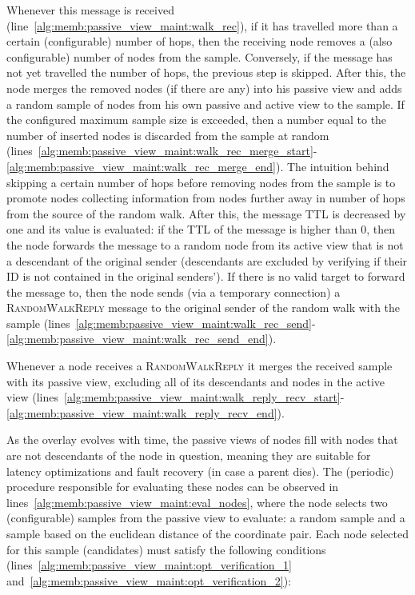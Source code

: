 

Whenever this message is received (line~\ref{alg:memb:passive_view_maint:walk_rec}), if it has travelled more than a certain (configurable) number of hops, then the receiving node removes a (also configurable) number of nodes from the sample. Conversely, if the message has not yet travelled the number of hops, the previous step is skipped. After this, the node merges the removed nodes (if there are any) into his passive view and adds a random sample of nodes from his own passive and active view to the sample. If the configured maximum sample size is exceeded, then a number equal to the number of inserted nodes is discarded from the sample at random (lines~\ref{alg:memb:passive_view_maint:walk_rec_merge_start}-\ref{alg:memb:passive_view_maint:walk_rec_merge_end}). The intuition behind skipping a certain number of hops before removing nodes from the sample is to promote nodes collecting information from nodes further away in number of hops from the source of the random walk. After this, the message TTL is decreased by one and its value is evaluated: if the TTL of the message is higher than 0, then the node forwards the message to a random node from its active view that is not a descendant of the original sender (descendants are excluded by verifying if their ID is not contained in the original senders'). If there is no valid target to forward the message to, then the node sends (via a temporary connection) a \textsc{RandomWalkReply} message to the original sender of the random walk with the sample (lines~\ref{alg:memb:passive_view_maint:walk_rec_send}-\ref{alg:memb:passive_view_maint:walk_rec_send_end}). 

Whenever a node receives a \textsc{RandomWalkReply} it merges the received sample with its passive view, excluding all of its descendants and nodes in the active view (lines~\ref{alg:memb:passive_view_maint:walk_reply_recv_start}-\ref{alg:memb:passive_view_maint:walk_reply_recv_end}).

As the overlay evolves with time, the passive views of nodes fill with nodes that are not descendants of the node in question, meaning they are suitable for latency optimizations and fault recovery (in case a parent dies). The (periodic) procedure responsible for evaluating these nodes can be observed in lines~\ref{alg:memb:passive_view_maint:eval_nodes}, where the node selects two (configurable) samples from the passive view to evaluate: a random sample and a sample based on the euclidean distance of the coordinate pair. Each node selected for this sample (candidates) must satisfy the following conditions (lines~\ref{alg:memb:passive_view_maint:opt_verification_1} and~\ref{alg:memb:passive_view_maint:opt_verification_2}): 

